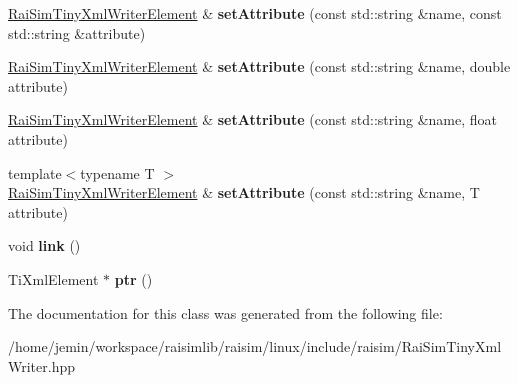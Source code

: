 \begin{DoxyCompactItemize}
\item 
\mbox{\label{classraisim_1_1RaiSimTinyXmlWriterElement_affca4f13cc688062b656d2ff1948246f}} 
\hyperlink{classraisim_1_1RaiSimTinyXmlWriterElement}{Rai\+Sim\+Tiny\+Xml\+Writer\+Element} \& {\bfseries set\+Attribute} (const std\+::string \&name, const std\+::string \&attribute)
\item 
\mbox{\label{classraisim_1_1RaiSimTinyXmlWriterElement_adb477e97cc6973cb310359394b477b98}} 
\hyperlink{classraisim_1_1RaiSimTinyXmlWriterElement}{Rai\+Sim\+Tiny\+Xml\+Writer\+Element} \& {\bfseries set\+Attribute} (const std\+::string \&name, double attribute)
\item 
\mbox{\label{classraisim_1_1RaiSimTinyXmlWriterElement_aee958af55577ddd69d0922d6992016d7}} 
\hyperlink{classraisim_1_1RaiSimTinyXmlWriterElement}{Rai\+Sim\+Tiny\+Xml\+Writer\+Element} \& {\bfseries set\+Attribute} (const std\+::string \&name, float attribute)
\item 
\mbox{\label{classraisim_1_1RaiSimTinyXmlWriterElement_ae502a76bb6d5fb7433716365babced21}} 
{\footnotesize template$<$typename T $>$ }\\\hyperlink{classraisim_1_1RaiSimTinyXmlWriterElement}{Rai\+Sim\+Tiny\+Xml\+Writer\+Element} \& {\bfseries set\+Attribute} (const std\+::string \&name, T attribute)
\item 
\mbox{\label{classraisim_1_1RaiSimTinyXmlWriterElement_a3bc0da2a1502233cfbc1a262647370f3}} 
void {\bfseries link} ()
\item 
\mbox{\label{classraisim_1_1RaiSimTinyXmlWriterElement_ac4599815476e197ca637bca53172dd7b}} 
Ti\+Xml\+Element $\ast$ {\bfseries ptr} ()
\end{DoxyCompactItemize}


The documentation for this class was generated from the following file\+:\begin{DoxyCompactItemize}
\item 
/home/jemin/workspace/raisimlib/raisim/linux/include/raisim/Rai\+Sim\+Tiny\+Xml\+Writer.\+hpp\end{DoxyCompactItemize}
